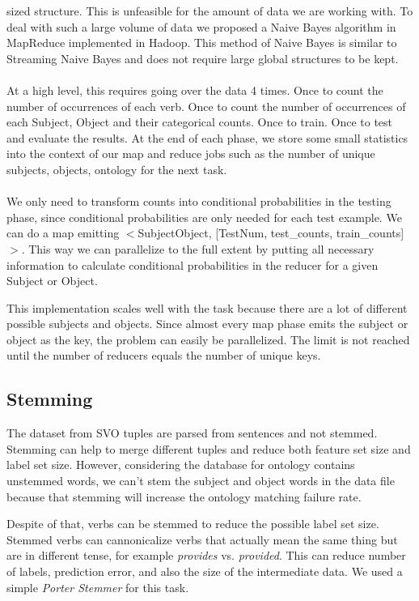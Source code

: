 sized structure. This is unfeasible for the amount of data we are working with. To deal with such a large volume of data we proposed a Naive Bayes algorithm in MapReduce implemented in Hadoop. This method of Naive Bayes is similar to Streaming Naive Bayes and does not require large global structures to be kept.\\
\\
At a high level, this requires going over the data 4 times. Once to count the number of occurrences of each verb. Once to count the number of occurrences of each Subject, Object and their categorical counts. Once to train. Once to test and evaluate the results. At the end of each phase, we store some small statistics into the context of our map and reduce jobs such as the number of unique subjects, objects, ontology for the next task.\\
\\
We only need to transform counts into conditional probabilities in the testing phase, since conditional probabilities are only needed for each test example. We can do a map emitting $<$Subject\/Object, [TestNum, test\_counts, train\_counts]$>$. This way we can parallelize to the full extent by putting all necessary information to calculate conditional probabilities in the reducer for a given Subject or Object.

This implementation scales well with the task because there are a lot of different possible subjects and objects. Since almost every map phase emits the subject or object as the key, the problem can easily be parallelized. The limit is not reached until the number of reducers equals the number of unique keys.

\subsection{Stemming}

The dataset from SVO tuples are parsed from sentences and not stemmed. Stemming can help to merge different tuples and reduce both feature set size and label set size. However, considering the database for ontology contains unstemmed words, we can't stem the subject and object words in the data file because that stemming will increase the ontology matching failure rate.

Despite of that, verbs can be stemmed to reduce the possible label set size. Stemmed verbs can cannonicalize verbs that actually mean the same thing but are in different tense, for example \emph{provides} vs. \emph{provided}. This can reduce number of labels, prediction error, and also the size of the intermediate data. We used a simple \emph{Porter Stemmer} for this task.

